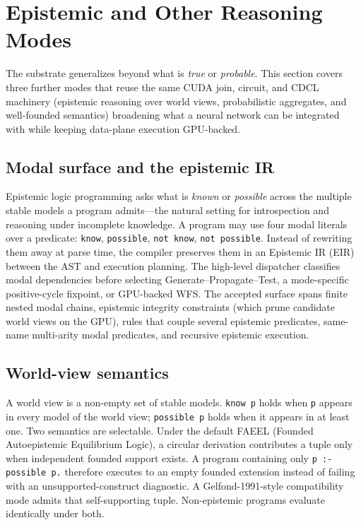 \section{Epistemic and Other Reasoning Modes}\label{sec:epistemic}

The substrate generalizes beyond what is \emph{true} or \emph{probable}. This section covers three further modes that reuse the same CUDA join, circuit, and CDCL machinery (epistemic reasoning over world views, probabilistic aggregates, and well-founded semantics) broadening what a neural network can be integrated with while keeping data-plane execution GPU-backed.

\subsection{Modal surface and the epistemic IR}

Epistemic logic programming asks what is \emph{known} or \emph{possible} across the multiple stable models a program admits---the natural setting for introspection and reasoning under incomplete knowledge. A program may use four modal literals over a predicate: \texttt{know}, \texttt{possible}, \texttt{not know}, \texttt{not possible}. Instead of rewriting them away at parse time, the compiler preserves them in an Epistemic IR (EIR) between the AST and execution planning. The high-level dispatcher classifies modal dependencies before selecting Generate--Propagate--Test, a mode-specific positive-cycle fixpoint, or GPU-backed WFS. The accepted surface spans finite nested modal chains, epistemic integrity constraints (which prune candidate world views on the GPU), rules that couple several epistemic predicates, same-name multi-arity modal predicates, and recursive epistemic execution.

\subsection{World-view semantics}

A world view is a non-empty set of stable models. \texttt{know p} holds when \texttt{p} appears in every model of the world view; \texttt{possible p} holds when it appears in at least one. Two semantics are selectable. Under the default FAEEL (Founded Autoepistemic Equilibrium Logic), a circular derivation contributes a tuple only when independent founded support exists. A program containing only \texttt{p :- possible p.} therefore executes to an empty founded extension instead of failing with an unsupported-construct diagnostic. A Gelfond-1991-style compatibility mode admits that self-supporting tuple. Non-epistemic programs evaluate identically under both.

